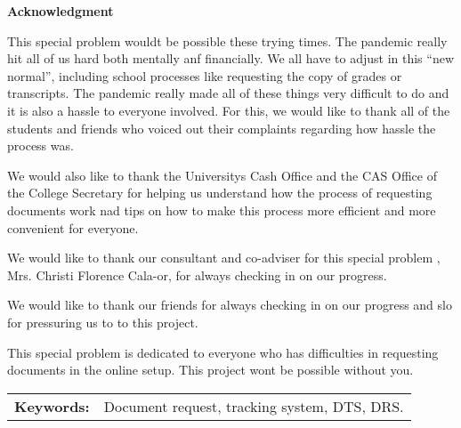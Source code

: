 \begin{center}
	\textbf{Acknowledgment}
\end{center}

\setlength{\parindent}{0pt}
This special problem would\textsc{}t be possible these trying times. The pandemic really hit all of us hard both mentally anf financially. We all have to adjust in this “new normal”, including school processes like requesting the copy of grades or transcripts. The pandemic really made all of these things very difficult to do and it is also a hassle to everyone involved. For this, we would like to thank all of the students and friends who voiced out their complaints regarding how hassle the process was. 

We would also like to thank the University\textsc{}s Cash Office  and the CAS Office of the College Secretary for helping us understand how the process of requesting documents work nad tips on how to make this process more efficient and more convenient for everyone. 

We would like to thank our consultant and co-adviser for this special problem , Mrs. Christi Florence Cala-or, for always checking in on our progress. 

We would like to thank our friends for always checking in on our progress and slo for pressuring us to to this project.

This special problem is dedicated to everyone who has difficulties in requesting documents in the online setup. This project won\textsc{}t be possible without you. 





\begin{tabular}{lp{4.25in}}
\hspace{-0.5em}\textbf{Keywords:}\hspace{0.25em} & Document request, tracking system, DTS, DRS.\\
\end{tabular}